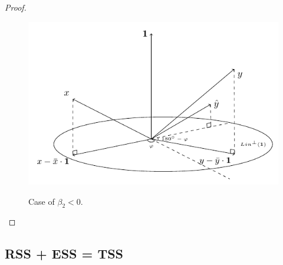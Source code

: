 \documentclass[nobib]{tufte-handout}
\begin{document}
\begin{proof}
\begin{figure}[h!]
\begin{center}
\includegraphics{images/corr_eq_negative.pdf}
\label{fig:corr_negative}
\caption{Case of $\beta_2 < 0$.}
\end{center}
\end{figure}
\end{proof}


\subsection{RSS + ESS = TSS}
\end{document}
